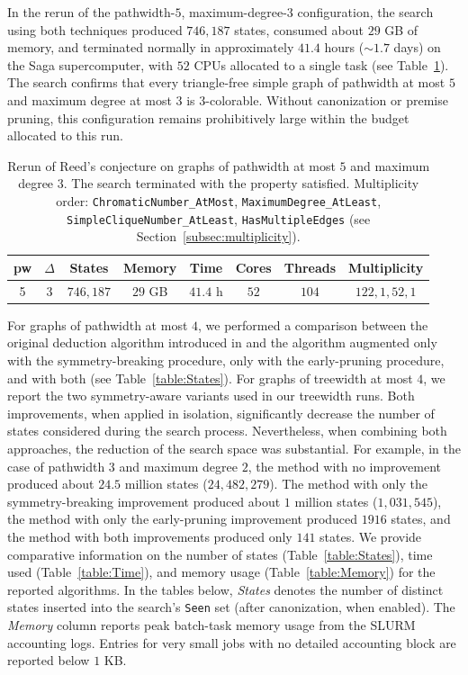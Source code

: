 \documentclass[11pt,a4paper]{article}
\begin{document}
In the rerun of the pathwidth-$5$, maximum-degree-$3$ configuration, the search using both techniques produced $746{,}187$ states, consumed about $29$ GB of memory, and terminated normally in approximately $41.4$ hours ($\sim 1.7$ days) on the Saga supercomputer, with $52$ CPUs allocated to a single task (see Table~\ref{table:conjecture-proof-experiments}). The search confirms that every triangle-free simple graph of pathwidth at most $5$ and maximum degree at most $3$ is $3$-colorable. Without canonization or premise pruning, this configuration remains prohibitively large within the budget allocated to this run.
\begin{table}[H]
    \centering
    \begin{tabular}{| c | c | c | c | c | c | c | c |}\hline
        pw & $\Delta$ & States & Memory & Time & Cores & Threads & Multiplicity\\ \hline
        5 & 3 & $746{,}187$ & $29$ GB & $41.4$ h & $52$ & $104$ & $122,1,52,1$\\ \hline
\end{tabular}
\caption{Rerun of Reed's conjecture on graphs of pathwidth at most $5$ and maximum degree $3$. The search terminated with the property satisfied. Multiplicity order: \texttt{ChromaticNumber\_AtMost}, \texttt{MaximumDegree\_AtLeast}, \texttt{SimpleCliqueNumber\_AtLeast}, \texttt{HasMultipleEdges} (see Section~\ref{subsec:multiplicity}).}
\label{table:conjecture-proof-experiments}
\end{table}

For graphs of pathwidth at most $4$, we performed a comparison between the original deduction algorithm introduced in \cite{de2023width} and the algorithm augmented only with the symmetry-breaking procedure, only with the early-pruning procedure, and with both (see Table~\ref{table:States}). For graphs of treewidth at most $4$, we report the two symmetry-aware variants used in our treewidth runs. Both improvements, when applied in isolation, significantly decrease the number of states considered during the search process. Nevertheless, when combining both approaches, the reduction of the search space was substantial. For example, in the case of pathwidth $3$ and maximum degree $2$, the method with no improvement produced about $24.5$ million states ($24{,}482{,}279$). The method with only the symmetry-breaking improvement produced about $1$ million states ($1{,}031{,}545$), the method with only the early-pruning improvement produced $1916$ states, and the method with both improvements produced only $141$ states. We provide comparative information on the number of states (Table~\ref{table:States}), time used (Table~\ref{table:Time}), and memory usage (Table~\ref{table:Memory}) for the reported algorithms.
In the tables below, \emph{States} denotes the number of distinct states inserted into the search's \texttt{Seen} set (after canonization, when enabled).
The \emph{Memory} column reports peak batch-task memory usage from the SLURM accounting logs. Entries for very small jobs with no detailed accounting block are reported below $1$ KB.
\end{document}
